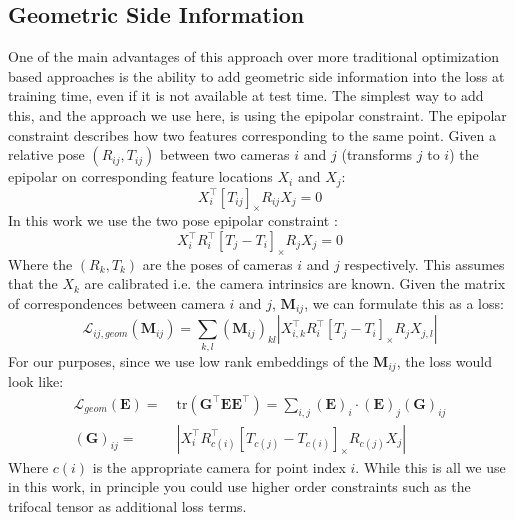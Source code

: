 \documentclass[10pt,twocolumn,letterpaper]{article}
\newcommand{\mat}[1]{\mathbf{#1}}
\newcommand{\cross}[1]{[#1]_{\times}}
\begin{document}
\subsection{Geometric Side Information}
One of the main advantages of this approach over more traditional optimization based approaches is the ability to add geometric side information into the loss at training time, even if it is not available at test time.
The simplest way to add this, and the approach we use here, is using the epipolar constraint.
The epipolar constraint describes how two features corresponding to the same point.
Given a relative pose $(R_{ij}, T_{ij})$ between two cameras $i$ and $j$  (transforms $j$ to $i$) the epipolar on corresponding feature locations $X_i$ and $X_j$:
\begin{equation}
X_{i}^\top \cross{T_{ij}}R_{ij} X_{j} = 0
\label{eq:essential_constraint_rel}
\end{equation}
In this work we use the two pose epipolar constraint \cite{tron2014quotient}:
\begin{equation}
X_{i}^\top R_{i}^\top \cross{T_{j} - T_{i}}R_{j} X_{j} = 0
\label{eq:essential_constraint}
\end{equation}
Where the $(R_k, T_k)$ are the poses of cameras $i$ and $j$ respectively.
This assumes that the $X_k$ are calibrated i.e. the camera intrinsics are known. 
Given the matrix of correspondences between camera $i$ and $j$, $\mat{M}_{ij}$, we can formulate this as a loss:
\begin{equation}
\mathcal{L}_{ij,geom}(\mat{M}_{ij}) = \sum_{k,l} (\mat{M}_{ij})_{kl} \left|X_{i,k}^\top R_{i}^\top \cross{T_{j} - T_{i}}R_{j} X_{j,l}\right|
\label{eq:geom_cost}
\end{equation}
For our purposes, since we use low rank embeddings of the $\mat{M}_{ij}$, the loss would look like:
\begin{align}
\mathcal{L}_{geom}(\mat{E})
=&\; \mathrm{tr}(\mat{G}^\top \mat{E}\mat{E}^\top) = \sum_{i,j} (\mat{E})_{i} \cdot (\mat{E})_{j} (\mat{G})_{ij} \\
(\mat{G})_{ij} =&\; \left|X_{i}^\top R_{c(i)}^\top \cross{T_{c(j)} - T_{c(i)}}R_{c(j)} X_{j}\right| \nonumber
\label{eq:geom_cost2}
\end{align}
Where $c(i)$ is the appropriate camera for point index $i$.
While this is all we use in this work, in principle you could use higher order constraints such as the trifocal tensor as additional loss terms.


\end{document}
